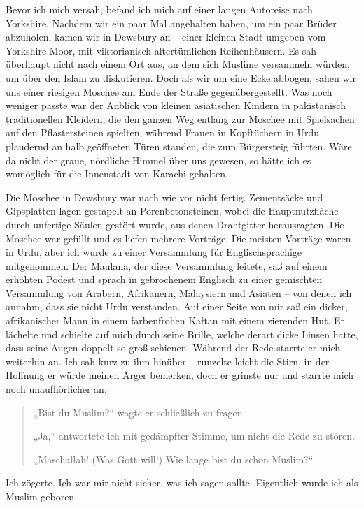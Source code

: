 \documentclass[12pt]{memoir}
\begin{document}
Bevor ich mich versah,
befand ich mich auf einer langen Autoreise nach Yorkshire.
Nachdem wir ein paar Mal angehalten haben, um ein paar Brüder abzuholen,
kamen wir in Dewsbury an – einer kleinen Stadt umgeben vom Yorkshire-Moor,
mit viktorianisch altertümlichen Reihenhäusern.
Es sah überhaupt nicht nach einem Ort aus,
an dem sich Muslime versammeln würden, um über den Islam zu diskutieren.
Doch als wir um eine Ecke abbogen,
sahen wir uns einer riesigen Moschee am Ende der Straße gegenübergestellt.
Was noch weniger passte war der Anblick von kleinen asiatischen Kindern
in pakistanisch traditionellen Kleidern,
die den ganzen Weg entlang zur Moschee
mit Spielsachen auf den Pflastersteinen spielten,
während Frauen in Kopftüchern in Urdu plaudernd
an halb geöffneten Türen standen, die zum Bürgersteig führten.
Wäre da nicht der graue, nördliche Himmel über uns gewesen,
so hätte ich es womöglich für die Innenstadt von Karachi gehalten.

Die Moschee in Dewsbury war nach wie vor nicht fertig.
Zementsäcke und Gipsplatten lagen gestapelt an Porenbetonsteinen,
wobei die Hauptnutzfläche durch unfertige Säulen gestört wurde,
aus denen Drahtgitter herausragten.
Die Moschee war gefüllt und es liefen mehrere Vorträge.
Die meisten Vorträge waren in Urdu,
aber ich wurde zu einer Versammlung für Englischsprachige mitgenommen.
Der Maulana, der diese Versammlung leitete, saß auf einem erhöhten Podest
und sprach in gebrochenem Englisch zu einer gemischten Versammlung
von Arabern, Afrikanern, Malaysiern und Asiaten –
von denen ich annahm, dass sie nicht Urdu verstanden.
Auf einer Seite von mir saß ein dicker,
afrikanischer Mann in einem farbenfrohen Kaftan mit einem zierenden Hut.
Er lächelte und schielte auf mich durch seine Brille,
welche derart dicke Linsen hatte, dass seine Augen doppelt so groß schienen.
Während der Rede starrte er mich weiterhin an.
Ich sah kurz zu ihm hinüber – runzelte leicht die Stirn,
in der Hoffnung er würde meinen Ärger bemerken,
doch er grinste nur und starrte mich noch unaufhörlicher an.

\begin{quote}
„Bist du Muslim?“ wagte er schließlich zu fragen.

„Ja,“ antwortete ich mit gedämpfter Stimme, um nicht die Rede zu stören.

„Maschallah! (Was Gott will!) Wie lange bist du schon Muslim?“
\end{quote}

Ich zögerte. Ich war mir nicht sicher, was ich sagen sollte.
Eigentlich wurde ich als Muslim geboren.
\end{document}
